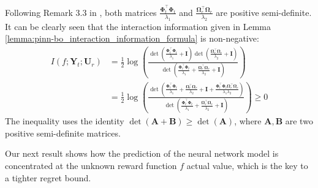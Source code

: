 \begin{remark}
    \label{remark:pinn-bo_non_negative_interaction_information}
    Following Remark 3.3 in \citet{wang2022and}, both matrices $\frac{\boldsymbol{\Phi}_t^\top \boldsymbol{\Phi}_t}{\lambda_1}$ and $\frac{\boldsymbol{\Omega}_r^\top \boldsymbol{\Omega}_r}{\lambda_2}$ are positive semi-definite. It can be clearly seen that the interaction information given in Lemma \ref{lemma:pinn-bo_interaction_information_formula} is non-negative:
    \begin{equation*}
    \begin{aligned}
            I (f; \mathbf{Y}_t; \mathbf{U}_r) &= \frac{1}{2}  \log (\frac{\det(\frac{\boldsymbol{\Phi}_t^\top \boldsymbol{\Phi}_t}{\lambda_1} + \mathbf{I})\det(\frac{\boldsymbol{\Omega}_r^\top \boldsymbol{\Omega}_r}{\lambda_2} + \mathbf{I})}{\det(\frac{\boldsymbol{\Phi}_t^\top \boldsymbol{\Phi}_t}{\lambda_1} + \frac{\boldsymbol{\Omega}_r^\top \boldsymbol{\Omega}_r}{\lambda_2} + \mathbf{I})}) \\
            &= \frac{1}{2}  \log (\frac{\det(\frac{\boldsymbol{\Phi}_t^\top \boldsymbol{\Phi}_t}{\lambda_1} + \frac{\boldsymbol{\Omega}_r^\top \boldsymbol{\Omega}_r}{\lambda_2}  + \mathbf{I} + \frac{\boldsymbol{\Phi}_t^\top \boldsymbol{\Phi}_t \boldsymbol{\Omega}_r^\top \boldsymbol{\Omega}_r}{\lambda_1 \lambda_2})}{\det(\frac{\boldsymbol{\Phi}_t^\top \boldsymbol{\Phi}_t}{\lambda_1} + \frac{\boldsymbol{\Omega}_r^\top \boldsymbol{\Omega}_r}{\lambda_2} + \mathbf{I})}) \ge 0
        \end{aligned}
    \end{equation*}
    The inequality uses the identity $\det(\mathbf{A}+ \mathbf{B}) \ge \det(\mathbf{A})$, where $\mathbf{A},\mathbf{B}$ are two positive semi-definite matrices. 
\end{remark}
Our next result shows how the prediction of the neural network model is concentrated at the unknown reward function $f$ actual value, which is the key to a tighter regret bound.

